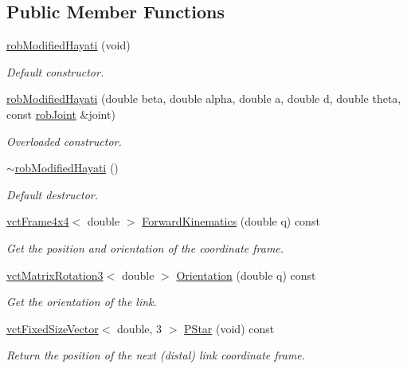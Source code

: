 \subsection*{Public Member Functions}
\begin{DoxyCompactItemize}
\item 
\hyperlink{classrob_modified_hayati_adaa5303b116a4802fbb98723b33ab9ee}{rob\-Modified\-Hayati} (void)
\begin{DoxyCompactList}\small\item\em Default constructor. \end{DoxyCompactList}\item 
\hyperlink{classrob_modified_hayati_a89a13613f31d524f9d44f76329f4165b}{rob\-Modified\-Hayati} (double beta, double alpha, double a, double d, double theta, const \hyperlink{classrob_joint}{rob\-Joint} \&joint)
\begin{DoxyCompactList}\small\item\em Overloaded constructor. \end{DoxyCompactList}\item 
\hyperlink{classrob_modified_hayati_a41630e035ce652db5c2fecbf3091e260}{$\sim$rob\-Modified\-Hayati} ()
\begin{DoxyCompactList}\small\item\em Default destructor. \end{DoxyCompactList}\item 
\hyperlink{classvct_frame4x4}{vct\-Frame4x4}$<$ double $>$ \hyperlink{classrob_modified_hayati_abca1919e45c034490e890649cadbf1da}{Forward\-Kinematics} (double q) const 
\begin{DoxyCompactList}\small\item\em Get the position and orientation of the coordinate frame. \end{DoxyCompactList}\item 
\hyperlink{classvct_matrix_rotation3}{vct\-Matrix\-Rotation3}$<$ double $>$ \hyperlink{classrob_modified_hayati_a53b44af7773748bf087062dec775acb9}{Orientation} (double q) const 
\begin{DoxyCompactList}\small\item\em Get the orientation of the link. \end{DoxyCompactList}\item 
\hyperlink{classvct_fixed_size_vector}{vct\-Fixed\-Size\-Vector}$<$ double, 3 $>$ \hyperlink{classrob_modified_hayati_afb9d219d3eab91f0273d133368480153}{P\-Star} (void) const 
\begin{DoxyCompactList}\small\item\em Return the position of the next (distal) link coordinate frame. \end{DoxyCompactList}\item 

\end{DoxyCompactItemize}
